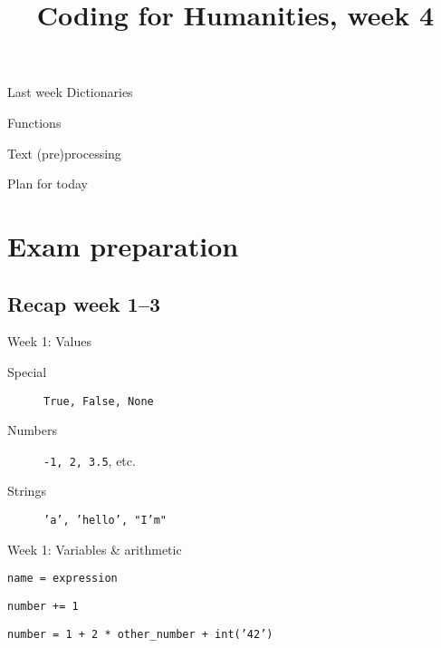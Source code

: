 \documentclass[aspectratio=169,usenames,dvipsnames]{beamer}
\title{Coding for Humanities, week 4}
\begin{document}
\begin{frame}
 \titlepage
\end{frame}

\begin{frame}{Last week}
    \large
    Dictionaries

    \vspace{1em}
    Functions

    \vspace{1em}
    Text (pre)processing
\end{frame}

\begin{frame}{Plan for today}
 \tableofcontents
\end{frame}

\section{Exam preparation}
\frame{\tableofcontents[currentsection]}

\subsection{Recap week 1--3}
\begin{frame}[fragile]{Week 1: Values}
    \begin{description}
        \item[Special] \texttt{True, False, None}
        \item[Numbers] \texttt{-1, 2, 3.5}, etc.
        \item[Strings] \texttt{'a', 'hello', "I'm"}
    \end{description}
\end{frame}

\begin{frame}[fragile]{Week 1: Variables \& arithmetic}
    \begin{description}[Assignment]
        \item[Assignment] \texttt{name = expression}
        \item[Increment] \texttt{number += 1}
        \item[Expressions] \texttt{number = 1 + 2 * other\_number + int('42')}
    \end{description}
\end{frame}
\end{document}
